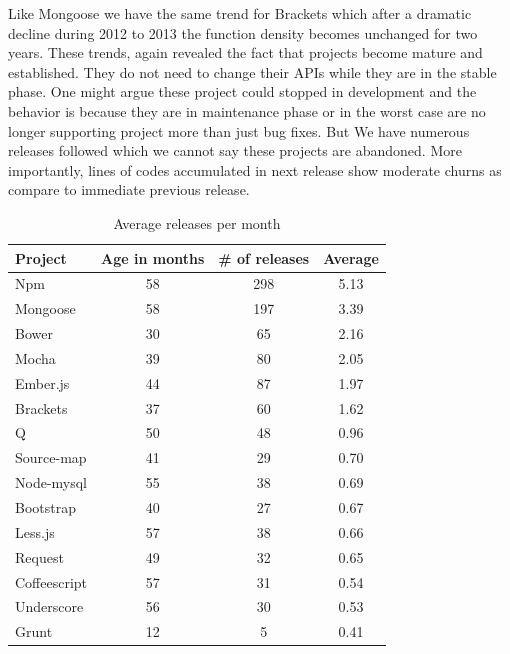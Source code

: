 \par
Like Mongoose we have the same trend for Brackets which after a dramatic decline during 2012 to 2013 the function density becomes unchanged for two years. These trends, again revealed the fact that projects become mature and established. They do not need to change their APIs while they are in the stable phase. One might argue these project could stopped in development and the behavior is because they are in maintenance phase or in the worst case are no longer supporting project more than just bug fixes. But We have numerous releases followed which we cannot say these projects are abandoned. More importantly, lines of codes accumulated in next release show moderate churns as compare to immediate previous release.  

\begin{table}[!hbt]
    \begin{center}
        \caption{Average releases per month}
        \label{tab:average_release}
        \begin{tabular}{l| c c c}
           \toprule
           \textbf{Project} & \textbf{Age in months} & \textbf{\# of releases} & \textbf{Average}\\ \midrule
           Npm          &    58 &  298 &   5.13 \\ 
           Mongoose     &    58 &  197 &   3.39 \\
           Bower        &    30 &   65 &   2.16 \\
           Mocha        &    39 &   80 &   2.05 \\
           Ember.js     &    44 &   87 &   1.97 \\
           Brackets     &    37 &   60 &   1.62 \\
           Q            &    50 &   48 &   0.96 \\
           Source-map   &    41 &   29 &   0.70 \\
           Node-mysql   &    55 &   38 &   0.69 \\
           Bootstrap    &    40 &   27 &   0.67 \\
           Less.js      &    57 &   38 &  0.66 \\
           Request      &    49 &   32 &  0.65 \\
           Coffeescript &    57 &   31 &  0.54 \\
           Underscore   &    56 &   30 &  0.53 \\
           Grunt        &    12 &    5 &  0.41 \\ \bottomrule
      \end{tabular}
    \end{center}
\end{table}

